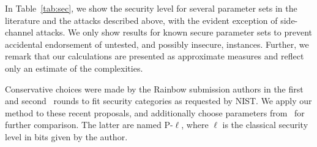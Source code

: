 \documentclass[12pt, a4paper, oneside]{memoir}
\theoremstyle{definition}
\begin{document}
In Table~\ref{tab:sec}, we show the security level for several parameter sets in the literature and the attacks described above, with the evident exception of side-channel attacks. We only show results for known secure parameter sets to prevent accidental endorsement of untested, and possibly insecure, instances. Further, we remark that our calculations are presented as approximate measures and reflect only an estimate of the complexities.

Conservative choices were made by the Rainbow submission authors in the first~\cite{Ding:201712} and second~\cite{Ding:201901} rounds to fit security categories as requested by NIST\@. We apply our method to these recent proposals, and additionally choose parameters from~\cite[Tables~6.12,~9.8]{Petzoldt:201307} for further comparison. The latter are named P-$\ell$, where $\ell$ is the classical security level in bits given by the author.
\end{document}
